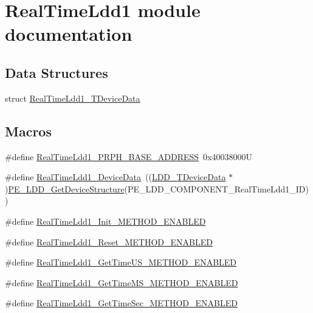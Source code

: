 \hypertarget{group___real_time_ldd1__module}{\section{Real\-Time\-Ldd1 module documentation}
\label{group___real_time_ldd1__module}
}
\subsection*{Data Structures}
\begin{DoxyCompactItemize}
\item 
struct \hyperlink{struct_real_time_ldd1___t_device_data}{Real\-Time\-Ldd1\-\_\-\-T\-Device\-Data}
\end{DoxyCompactItemize}
\subsection*{Macros}
\begin{DoxyCompactItemize}
\item 
\#define \hyperlink{group___real_time_ldd1__module_ga23f6f90d0c410fd4cf319771b40219ed}{Real\-Time\-Ldd1\-\_\-\-P\-R\-P\-H\-\_\-\-B\-A\-S\-E\-\_\-\-A\-D\-D\-R\-E\-S\-S}~0x40038000\-U
\item 
\#define \hyperlink{group___real_time_ldd1__module_gacfe72af829146d3851fed2d4c9279d1a}{Real\-Time\-Ldd1\-\_\-\-Device\-Data}~((\hyperlink{group___p_e___types__module_gac5cf1362f1f0e3a2ce71b1bf2276d091}{L\-D\-D\-\_\-\-T\-Device\-Data} $\ast$)\hyperlink{group___p_e___types__module_gaa1c23d559daef5bcd3327ca83fb56f5a}{P\-E\-\_\-\-L\-D\-D\-\_\-\-Get\-Device\-Structure}(P\-E\-\_\-\-L\-D\-D\-\_\-\-C\-O\-M\-P\-O\-N\-E\-N\-T\-\_\-\-Real\-Time\-Ldd1\-\_\-\-I\-D))
\item 
\#define \hyperlink{group___real_time_ldd1__module_ga817a7a637189278e19ece6c0c5e44fd4}{Real\-Time\-Ldd1\-\_\-\-Init\-\_\-\-M\-E\-T\-H\-O\-D\-\_\-\-E\-N\-A\-B\-L\-E\-D}
\item 
\#define \hyperlink{group___real_time_ldd1__module_ga279a0fe33f320369d8129664a911cfa7}{Real\-Time\-Ldd1\-\_\-\-Reset\-\_\-\-M\-E\-T\-H\-O\-D\-\_\-\-E\-N\-A\-B\-L\-E\-D}
\item 
\#define \hyperlink{group___real_time_ldd1__module_gab91b5d1488f3125fed90de7f3c6e35fe}{Real\-Time\-Ldd1\-\_\-\-Get\-Time\-U\-S\-\_\-\-M\-E\-T\-H\-O\-D\-\_\-\-E\-N\-A\-B\-L\-E\-D}
\item 
\#define \hyperlink{group___real_time_ldd1__module_gae8933abe6f4042d28ffd814410b0c85c}{Real\-Time\-Ldd1\-\_\-\-Get\-Time\-M\-S\-\_\-\-M\-E\-T\-H\-O\-D\-\_\-\-E\-N\-A\-B\-L\-E\-D}
\item 
\#define \hyperlink{group___real_time_ldd1__module_ga14dbbf48dc23ec1126c5c29a2f4d5f4b}{Real\-Time\-Ldd1\-\_\-\-Get\-Time\-Sec\-\_\-\-M\-E\-T\-H\-O\-D\-\_\-\-E\-N\-A\-B\-L\-E\-D}
\end{DoxyCompactItemize}
